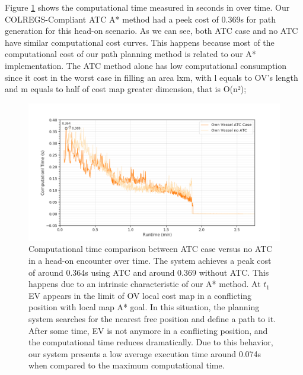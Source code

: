        Figure \ref{fig:plot_ho_w_vs_wo_CT} shows the computational time measured in seconds in over time. Our COLREGS-Compliant \ac{ATC} A* method had a peek cost of 0.369s for path generation for this head-on scenario. As we can see, both \ac{ATC} case and no \ac{ATC} have similar computational cost curves. This happens because most of the computational cost of our path planning method is related to our A* implementation. The \ac{ATC} method alone has low computational consumption since it cost in the worst case in filling an area lxm, with l equals to \ac{OV}'s length and m equals to half of cost map greater dimension, that is O(n²);
        \begin{figure}[H]
            \centering
            \includegraphics[width=\textwidth]{figs/Chap5/plot_ho_w_vs_wo_CT.png}
            \caption{Computational time comparison between \ac{ATC} case versus no \ac{ATC} in a head-on encounter over time. The system achieves a peak cost of around 0.364s using \ac{ATC} and around 0.369 without \ac{ATC}. This happens due to an intrinsic characteristic of our A* method. At $t_1$ \ac{EV} appears in the limit of \ac{OV} local cost map in a conflicting position with local map A* goal. In this situation, the planning system searches for the nearest free position and define a path to it. After some time, \ac{EV} is not anymore in a conflicting position, and the computational time reduces dramatically. Due to this behavior, our system presents a low average execution time around 0.074s when compared to the maximum computational time.}
            \label{fig:plot_ho_w_vs_wo_CT}
        \end{figure}
        
